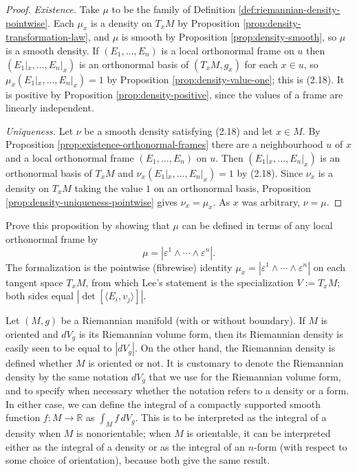 \begin{proof}
\leanok
{}
\emph{Existence.} Take $\mu$ to be the family of Definition \ref{def:riemannian-density-pointwise}.
Each $\mu_x$ is a density on $T_x M$ by Proposition \ref{prop:density-transformation-law}, and
$\mu$ is smooth by Proposition \ref{prop:density-smooth}, so $\mu$ is a smooth density. If
$(E_1, \ldots, E_n)$ is a local orthonormal frame on $u$ then $(E_1|_x, \ldots, E_n|_x)$ is an
orthonormal basis of $(T_x M, g_x)$ for each $x \in u$, so $\mu_x(E_1|_x, \ldots, E_n|_x) = 1$ by
Proposition \ref{prop:density-value-one}; this is (2.18). It is positive by Proposition
\ref{prop:density-positive}, since the values of a frame are linearly independent.

\emph{Uniqueness.} Let $\nu$ be a smooth density satisfying (2.18) and let $x \in M$. By
Proposition \ref{prop:existence-orthonormal-frames} there are a neighbourhood $u$ of $x$ and a
local orthonormal frame $(E_1, \ldots, E_n)$ on $u$. Then $(E_1|_x, \ldots, E_n|_x)$ is an
orthonormal basis of $T_x M$ and $\nu_x(E_1|_x, \ldots, E_n|_x) = 1$ by (2.18). Since $\nu_x$ is a
density on $T_x M$ taking the value $1$ on an orthonormal basis, Proposition
\ref{prop:density-uniqueness-pointwise} gives $\nu_x = \mu_x$. As $x$ was arbitrary, $\nu = \mu$.
\end{proof}

\begin{exercise}\label{exer:riemannian-density-formula}
\leanok
{}
Prove this proposition by showing that $\mu$ can be defined in terms of any local orthonormal frame by
\[
\mu = |\varepsilon^1 \wedge \cdots \wedge \varepsilon^n|.
\]
The formalization is the pointwise (fibrewise) identity $\mu_x = |\varepsilon^1 \wedge \cdots \wedge \varepsilon^n|$ on each tangent space $T_xM$, from which Lee's statement is the specialization $V := T_xM$; both sides equal $|\det[\langle E_i, v_j\rangle]|$.
\end{exercise}

Let $(M,g)$ be a Riemannian manifold (with or without boundary). If $M$ is oriented and $dV_g$ is its Riemannian volume form, then its Riemannian density is easily seen to be equal to $|dV_g|$. On the other hand, the Riemannian density is defined whether $M$ is oriented or not. It is customary to denote the Riemannian density by the same notation $dV_g$ that we use for the Riemannian volume form, and to specify when necessary whether the notation refers to a density or a form. In either case, we can define the integral of a compactly supported smooth function $f: M \to \mathbb{R}$ as $\int_M f\, dV_g$. This is to be interpreted as the integral of a density when $M$ is nonorientable; when $M$ is orientable, it can be interpreted either as the integral of a density
or as the integral of an $n$-form (with respect to some choice of orientation), because
both give the same result.

